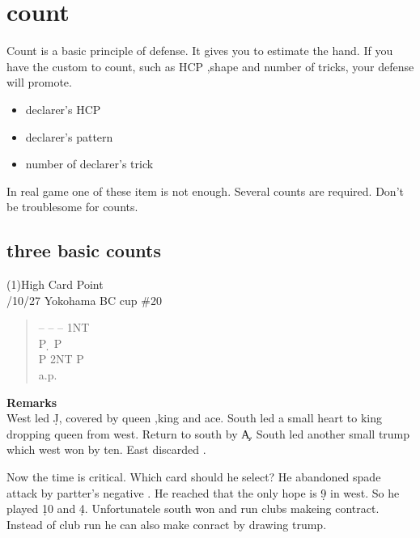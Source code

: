 \chapter{count}
Count is a basic principle of defense. It gives you
to estimate the hand. If you have the custom to count,
such as HCP ,shape and number of tricks, your defense will
promote.
\begin{itemize}
\item{declarer's HCP}
\item{declarer's pattern}
\item{number of declarer's trick}
\end{itemize}
In real game one of these item is not enough.
Several counts are required. Don't be troublesome for
counts.

\section{three basic counts}

(1)High Card Point\\

/10/27 Yokohama BC cup \#20
\begin{quote}
%
  {}%
  {}%
  {}%
  {}%
  \end{quote}
\begin{quote}
\begin{bidding}
--  \> -- \> -- \> 1NT \\
P \d \> P \h \\
P \> 2NT \>  P \h \\
a.p.
\end{bidding}
\end{quote}
%
{\bf Remarks}\\
West led \d J, covered by queen ,king and ace. South
led a small heart to king dropping queen from west.  Return to south by \c A.
South led another small trump which west won by ten. East discarded .

Now the time is critical. Which card should he select? He abandoned spade attack by partter's negative . He reached that the only hope is \d 9 in west.
So he played \d 10 and \d 4. Unfortunatele south won and run clubs makeing 
contract. Instead of club run he can also make conract by drawing trump.

